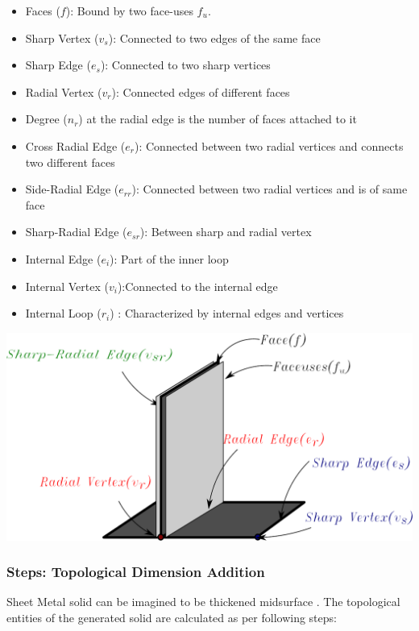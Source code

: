 \begin{itemize} 
[noitemsep,topsep=2pt,parsep=2pt,partopsep=2pt,label=\textbullet]\label{list_topos}
\item Faces ($f$): Bound by two face-uses $f_u$.

\item Sharp Vertex ($v_s$): Connected to two edges of the same face
\item Sharp Edge ($e_s$): Connected to two sharp vertices

\item Radial Vertex ($v_{r}$): Connected edges of different faces
\item Degree ($n_{r}$) at the radial edge is the number of faces attached to it 
\item Cross Radial Edge ($e_{r}$): Connected between two radial vertices and connects two different faces
\item Side-Radial  Edge ($e_{rr}$): Connected between two radial vertices and is of same face
\item Sharp-Radial Edge ($e_{sr}$): Between sharp and radial vertex
\item Internal Edge ($e_i$): Part of the inner loop
\item Internal Vertex ($v_i$):Connected to the internal edge
\item Internal Loop ($r_i$) : Characterized by internal edges and vertices
\end{itemize}

\begin{minipage}[t]{\linewidth}
\centering 
\includegraphics[width=\linewidth]{../Common/images/NonManifoldT1.pdf}
\vspace{2mm}
\label{fig_nonmanifold}
\end{minipage}


\subsubsection{Steps: Topological Dimension Addition}
Sheet Metal solid can be imagined to be thickened midsurface \cite{SHLee2001}. The topological entities of the generated solid are calculated as per following steps: %

